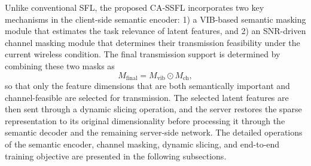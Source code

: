 Unlike conventional SFL, the proposed CA-SSFL incorporates two key mechanisms in the client-side semantic encoder: 1) a VIB-based semantic masking module that estimates the task relevance of latent features, and 2) an SNR-driven channel masking module that determines their transmission feasibility under the current wireless condition. The final transmission support is determined by combining these two masks as
\begin{equation}
M_{\mathrm{final}} = M_{\mathrm{vib}} \odot M_{\mathrm{ch}},
\end{equation}
so that only the feature dimensions that are both semantically important and channel-feasible are selected for transmission. The selected latent features are then sent through a dynamic slicing operation, and the server restores the sparse representation to its original dimensionality before processing it through the semantic decoder and the remaining server-side network. The detailed operations of the semantic encoder, channel masking, dynamic slicing, and end-to-end training objective are presented in the following subsections.

%
%
